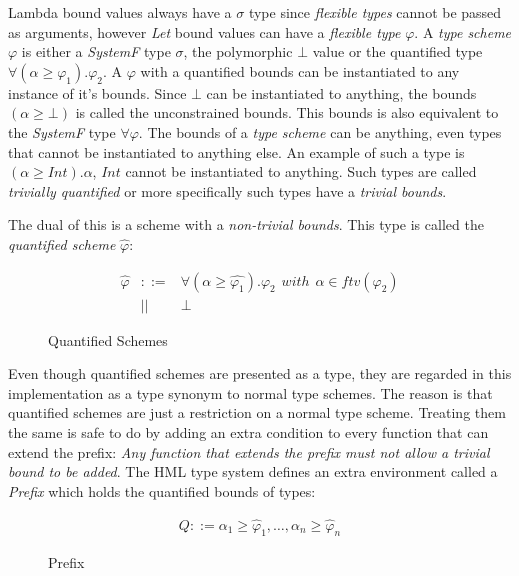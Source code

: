 Lambda bound values always have a $\sigma$ type since \emph{flexible types} cannot be passed as arguments, however \emph{Let} bound values can have a \emph{flexible type} $\varphi$.
A \emph{type scheme} $\varphi$ is either a \emph{SystemF} type $\sigma$, the polymorphic $\bot$ value or the quantified type $\forall (\alpha \geq \varphi_1). \varphi_2$. A $\varphi$ with a quantified bounds can be instantiated to any instance of it's bounds. Since $\bot$ can be instantiated to anything, the bounds $(\alpha \geq \bot)$ is called the unconstrained bounds. This bounds is also equivalent to the \emph{SystemF} type $\forall \varphi$. The bounds of a \emph{type scheme} can be anything, even types that cannot be instantiated to anything else. An example of such a type is $(\alpha \geq Int).\alpha$, $Int$ cannot be instantiated to anything. Such types are called \emph{trivially quantified} or more specifically such types have a \emph{trivial bounds}.

The dual of this is a scheme with a \emph{non-trivial bounds}. This type is called the \emph{quantified scheme} $\hat{\varphi}$:

\begin{figure}[H]
\begin{eqnarray*}
\hat{\varphi} & ::= & \forall (\alpha \geq \hat{\varphi_1}). \varphi_2 \hspace{5pt} with \hspace{5pt} \alpha \in ftv(\varphi_2) \\
              & || & \bot
\end{eqnarray*}
\caption{Quantified Schemes}
\label{quantified-schemes}
\end{figure}

Even though quantified schemes are presented as a type, they are regarded in this implementation as a type synonym to normal type schemes. The reason is that quantified schemes are just a restriction on a normal type scheme. Treating them the same is safe to do by adding an extra condition to every function that can extend the prefix: \emph{Any function that extends the prefix must not allow a trivial bound to be added}.
The HML type system defines an extra environment called a \emph{Prefix} which holds the quantified bounds of types:

\begin{figure}[H]
\begin{eqnarray*}
Q ::= \alpha_1\geq\hat{\varphi}_1,\ldots,\alpha_n\geq\hat{\varphi}_n
\end{eqnarray*}
\caption{Prefix}
\label{Prefix}
\end{figure}

